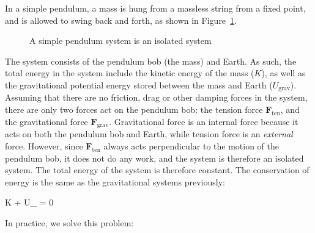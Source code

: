 In a simple pendulum, a mass is hung from a massless string from a fixed point,
and is allowed to swing back and forth, as shown in
Figure~\ref{fig:pendulum-system}.
\begin{figure}[ht]
  \centering
  \caption{A simple pendulum system is an isolated system}
  \label{fig:pendulum-system}
\end{figure}
The system consists of the pendulum bob (the mass) and Earth. As such, the
total energy in the system include the kinetic energy of the mass ($K$), as
well as the gravitational potential energy stored between the mass and Earth
($U_\text{grav}$). Assuming that there are no friction, drag or other damping
forces in the system, there are only two forces act on the pendulum bob: the
tension force $\bm F_\text{ten}$, and the gravitational force $\bm F_\text{grav}$.
Gravitational force is an internal force because it acts on both the pendulum
bob and Earth, while tension force is an \emph{external} force. However, since
$\bm F_\text{ten}$ always acts perpendicular to the motion of the pendulum bob,
it does not do any work, and the system is therefore an isolated system. The
total energy of the system is therefore constant. The conservation of energy
is the same as the gravitational systems previously:
\begin{important-equation}
  \Delta K + \Delta U_ = 0 \quad{}
\end{important-equation}
In practice, we solve this problem:
